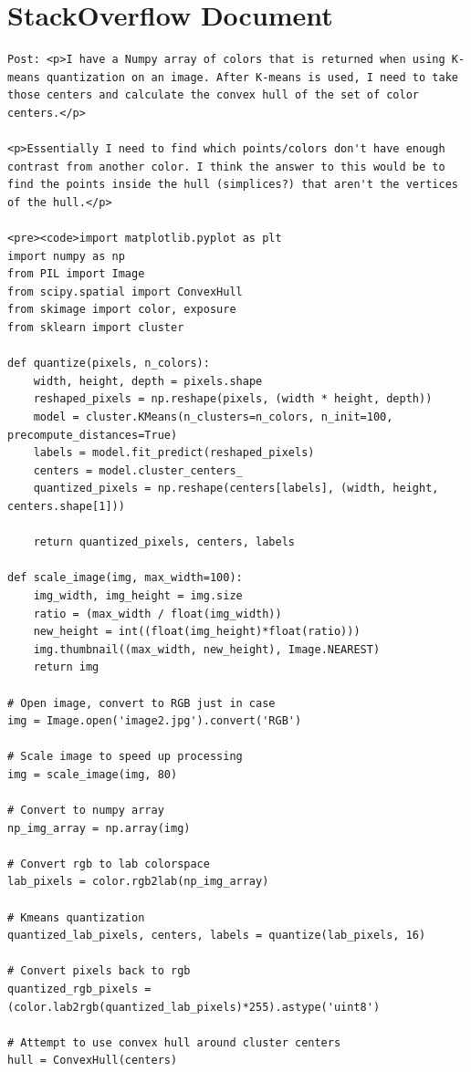 \documentclass[a4paper,oneside]{book}
\begin{document}
\chapter{StackOverflow Document}
\label{app:stackoverflow_doc}
\begin{lstlisting}
Post: <p>I have a Numpy array of colors that is returned when using K-means quantization on an image. After K-means is used, I need to take those centers and calculate the convex hull of the set of color centers.</p>

<p>Essentially I need to find which points/colors don't have enough contrast from another color. I think the answer to this would be to find the points inside the hull (simplices?) that aren't the vertices of the hull.</p>

<pre><code>import matplotlib.pyplot as plt
import numpy as np
from PIL import Image
from scipy.spatial import ConvexHull
from skimage import color, exposure
from sklearn import cluster

def quantize(pixels, n_colors):
    width, height, depth = pixels.shape
    reshaped_pixels = np.reshape(pixels, (width * height, depth))
    model = cluster.KMeans(n_clusters=n_colors, n_init=100, precompute_distances=True)
    labels = model.fit_predict(reshaped_pixels)
    centers = model.cluster_centers_
    quantized_pixels = np.reshape(centers[labels], (width, height, centers.shape[1]))

    return quantized_pixels, centers, labels

def scale_image(img, max_width=100):
    img_width, img_height = img.size
    ratio = (max_width / float(img_width))
    new_height = int((float(img_height)*float(ratio)))
    img.thumbnail((max_width, new_height), Image.NEAREST)
    return img

# Open image, convert to RGB just in case
img = Image.open('image2.jpg').convert('RGB')

# Scale image to speed up processing
img = scale_image(img, 80)

# Convert to numpy array
np_img_array = np.array(img)

# Convert rgb to lab colorspace
lab_pixels = color.rgb2lab(np_img_array)

# Kmeans quantization
quantized_lab_pixels, centers, labels = quantize(lab_pixels, 16)

# Convert pixels back to rgb
quantized_rgb_pixels = (color.lab2rgb(quantized_lab_pixels)*255).astype('uint8')

# Attempt to use convex hull around cluster centers
hull = ConvexHull(centers)


\end{lstlisting}
\end{document}
